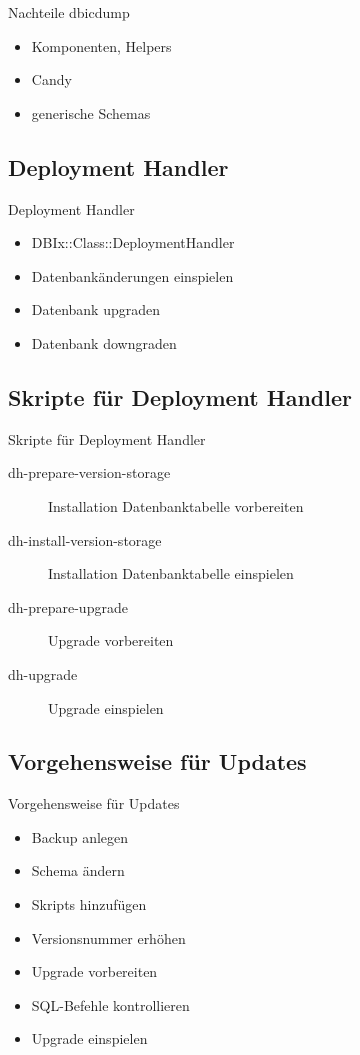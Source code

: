 \begin{frame}[fragile]{Nachteile dbicdump}
\begin{itemize}
\item Komponenten, Helpers
\item Candy
\item generische Schemas
\end{itemize}
\end{frame}

\subsection{Deployment Handler}

\begin{frame}{Deployment Handler}
\begin{itemize}
\item DBIx::Class::DeploymentHandler
\item Datenbankänderungen einspielen
\item Datenbank upgraden
\item Datenbank downgraden
\end{itemize}
\end{frame}

\subsection{Skripte für Deployment Handler}
\begin{frame}{Skripte für Deployment Handler}
\begin{description}
\item[dh-prepare-version-storage] Installation Datenbanktabelle vorbereiten
\item[dh-install-version-storage] Installation Datenbanktabelle einspielen
\item[dh-prepare-upgrade] Upgrade vorbereiten
\item[dh-upgrade] Upgrade einspielen
\end{description}
\end{frame}

\subsection{Vorgehensweise für Updates}

\begin{frame}{Vorgehensweise für Updates}
\begin{itemize}
\item Backup anlegen
\item Schema ändern
\item Skripts hinzufügen
\item Versionsnummer erhöhen
\item Upgrade vorbereiten
\item SQL-Befehle kontrollieren
\item Upgrade einspielen
\end{itemize}
\end{frame}

